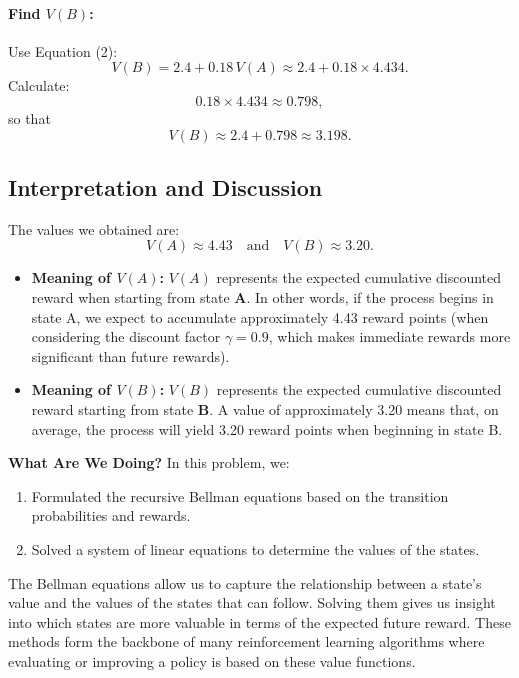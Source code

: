 \documentclass[11pt]{article}
\begin{document}
\paragraph{Find \( V(B) \):}  
Use Equation (2):
\[
V(B) = 2.4 + 0.18\, V(A) \approx 2.4 + 0.18 \times 4.434.
\]
Calculate:
\[
0.18 \times 4.434 \approx 0.798,
\]
so that
\[
V(B) \approx 2.4 + 0.798 \approx 3.198.
\]

\subsection*{Interpretation and Discussion}

The values we obtained are:
\[
V(A) \approx 4.43 \quad \text{and} \quad V(B) \approx 3.20.
\]

\begin{itemize}
    \item \textbf{Meaning of \( V(A) \):}  
    \( V(A) \) represents the expected cumulative discounted reward when starting from state \textbf{A}. In other words, if the process begins in state A, we expect to accumulate approximately 4.43 reward points (when considering the discount factor \( \gamma = 0.9 \), which makes immediate rewards more significant than future rewards).

    \item \textbf{Meaning of \( V(B) \):}  
    \( V(B) \) represents the expected cumulative discounted reward starting from state \textbf{B}. A value of approximately 3.20 means that, on average, the process will yield 3.20 reward points when beginning in state B.
\end{itemize}

\medskip

\noindent\textbf{What Are We Doing?}  
In this problem, we:
\begin{enumerate}
    \item Formulated the recursive Bellman equations based on the transition probabilities and rewards.
    \item Solved a system of linear equations to determine the values of the states.
\end{enumerate}

The Bellman equations allow us to capture the relationship between a state's value and the values of the states that can follow. Solving them gives us insight into which states are more valuable in terms of the expected future reward. These methods form the backbone of many reinforcement learning algorithms where evaluating or improving a policy is based on these value functions.
\end{document}
